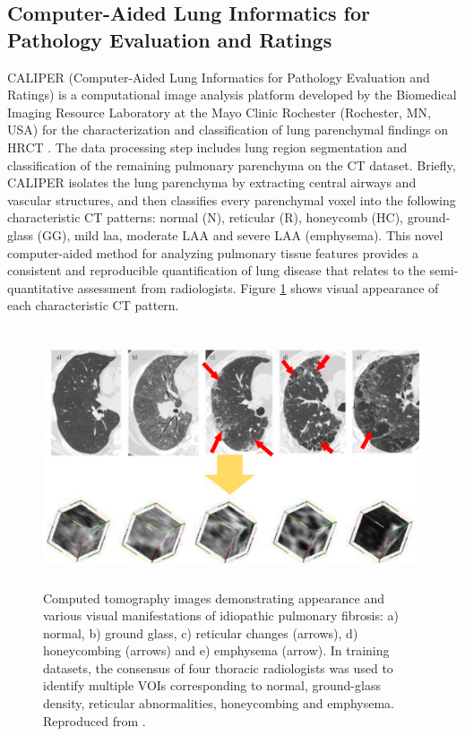 \subsection{Computer-Aided Lung Informatics for Pathology Evaluation and Ratings} \label{CALIPERIntroduction}
CALIPER (Computer-Aided Lung Informatics for Pathology Evaluation and Ratings) is a computational image analysis platform developed by the Biomedical Imaging Resource Laboratory at the Mayo Clinic Rochester (Rochester, MN, USA) for the characterization and classification of lung parenchymal findings on HRCT \citep{maldonado2013automated,bartholmai2013quantitative,raghunath2014quantitative}. The data processing step includes lung region segmentation and classification of the remaining pulmonary parenchyma on the CT dataset. Briefly, CALIPER isolates the lung parenchyma by extracting central airways and vascular structures, and then classifies every parenchymal voxel into the following characteristic CT patterns: normal (N), reticular (R), honeycomb (HC), ground-glass (GG), mild \gls{laa}, moderate LAA and severe LAA (emphysema). This novel computer-aided method for analyzing pulmonary tissue features provides a consistent and reproducible quantification of lung disease that relates to the semi-quantitative assessment from radiologists\citep{maldonado2013automated}. Figure \ref{fig:CALIPERPatterns} shows visual appearance of each characteristic CT pattern.

\begin{figure}[htbp]
  \centering 
  \includegraphics[height=3.0in]{QuantitativeAnalysis/Image/CALIPERPatterns.png}
  \caption{Computed tomography images demonstrating appearance and various visual manifestations of idiopathic pulmonary fibrosis: a) normal, b) ground glass, c) reticular changes (arrows), d) honeycombing (arrows) and e) emphysema (arrow). In training datasets, the consensus of four thoracic radiologists was used to identify multiple VOIs corresponding to normal, ground-glass density, reticular abnormalities, honeycombing and emphysema. Reproduced from \citep{maldonado2013automated}.}
  \label{fig:CALIPERPatterns}
\end{figure}

